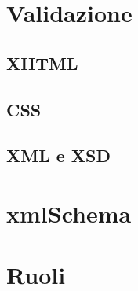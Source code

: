 \documentclass[12pt]{article}
\begin{document}
		
\section{Validazione}
	\subsection{XHTML}
	\subsection{CSS}
	\subsection{XML e XSD}

\section{xmlSchema}



\section{Ruoli}

	


\newpage
\end{document}

